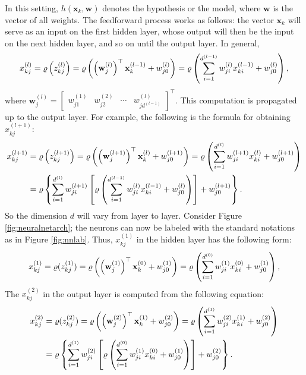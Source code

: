 In this setting, $h(\mathbf{x}_k,\mathbf{w})$ denotes the hypothesis or the model, where $\mathbf{w}$ is the vector of all weights. The feedforward process works as follows: the vector $\mathbf{x}_k$ will serve as an input on the first hidden layer, whose output will then be the input on the next hidden layer, and so on until the output layer. In general,
$$
x_{kj}^{(l)}=\varrho\left(z_{kj}^{(l)}\right)=\varrho\left(\left(\mathbf{w}_{j}^{(l)}\right)^{\top}\mathbf{x}_k^{(l-1)} + w_{j0}^{(l)}\right)=\varrho\left(\sum_{i=1}^{d^{(l-1)}}w_{ji}^{(l)}x_{ki}^{(l-1)}+w_{j0}^{(l)}\right),
$$
where $\mathbf{w}_{j}^{(l)}=\left[\begin{array}{cccc}w_{j1}^{(1)}&w_{j2}^{(2)}&\cdots&w_{jd^{(l-1)}}^{(l)}\end{array}\right]^{\top}$. This computation is propagated up to the output layer. For example, the following is the formula for obtaining $x_{kj}^{(l+1)}$:
$$
\begin{aligned}
x_{kj}^{(l+1)}&=\varrho\left(z_{kj}^{(l+1)}\right)=\varrho\left(\left(\mathbf{w}_{j}^{(l+1)}\right)^{\top}\mathbf{x}_k^{(l)} + w_{j0}^{(l+1)}\right)=\varrho\left(\sum_{i=1}^{d^{(l)}}w_{ji}^{(l+1)}x_{ki}^{(l)}+w_{j0}^{(l+1)}\right)\\
&=\varrho\left\{\sum_{i=1}^{d^{(l)}}w_{ji}^{(l+1)}\left[\varrho\left(\sum_{i=1}^{d^{(l-1)}}w_{ji}^{(l)}x_{ki}^{(l-1)}+w_{j0}^{(l)}\right)\right]+w_{j0}^{(l+1)}\right\}.
\end{aligned}
$$
So the dimension $d$ will vary from layer to layer. Consider Figure \ref{fig:neuralnetarch}; the neurons can now be labeled with the standard notations as in Figure \ref{fig:nnlab}.
Thus, $x_{kj}^{(1)}$ in the hidden layer has the following form:
$$
x_{kj}^{(1)}=\varrho(z_{kj}^{(1)})=\varrho\left(\left(\mathbf{w}_{j}^{(1)}\right)^{\top}\mathbf{x}_k^{(0)} + w_{j0}^{(1)}\right)=\varrho\left(\sum_{i=1}^{d^{(0)}}w_{ji}^{(1)}x_{ki}^{(0)}+w_{j0}^{(1)}\right),
$$
The $x_{kj}^{(2)}$ in the output layer is computed from the following equation:
$$
\begin{aligned}
x_{kj}^{(2)}&=\varrho(z_{kj}^{(2)})=\varrho\left(\left(\mathbf{w}_{j}^{(2)}\right)^{\top}\mathbf{x}_k^{(1)} + w_{j0}^{(2)}\right)=\varrho\left(\sum_{i=1}^{d^{(1)}}w_{ji}^{(2)}x_{ki}^{(1)}+w_{j0}^{(2)}\right)\\
&=\varrho\left\{\sum_{i=1}^{d^{(1)}}w_{ji}^{(2)}\left[\varrho\left(\sum_{i=1}^{d^{(0)}}w_{ji}^{(1)}x_{ki}^{(0)}+w_{j0}^{(1)}\right)\right]+w_{j0}^{(2)}\right\}.
\end{aligned}
$$

